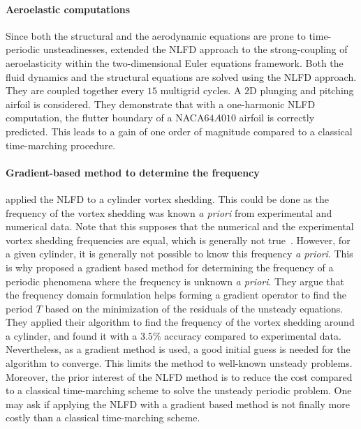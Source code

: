 \paragraph{Aeroelastic computations}
Since both the structural and the aerodynamic equations
are prone to time-periodic unsteadinesses,
\citet{Kachra2008} extended the NLFD approach to the strong-coupling of
aeroelasticity within the two-dimensional Euler equations framework.
Both the fluid dynamics and the structural equations
are solved using the NLFD approach. They are coupled together 
every $15$ multigrid cycles.
A $2$D plunging and pitching airfoil is considered.
They demonstrate that with a one-harmonic NLFD computation, the
flutter boundary of a NACA$64A010$ airfoil is correctly predicted.
This leads to a gain of one order of magnitude compared to a classical
time-marching procedure. 

\paragraph{Gradient-based method to determine the frequency}
\label{par:gradient_nlfd}
\citet{McMullen2001} applied the NLFD to a cylinder
vortex shedding. This could be done as the frequency of the
vortex shedding was known \emph{a priori} from experimental
and numerical data. Note that this supposes that the
numerical and the experimental vortex shedding frequencies
are equal, which is generally not true~\cite{Kato1991}.
However, for a given cylinder, it is generally not
possible to know this frequency \emph{a priori}. This is why
\citet{McMullen2002, McMullen2006a}
proposed a gradient based method for determining the frequency
of a periodic phenomena where the frequency is unknown
\emph{a priori}. They argue that the frequency domain formulation
helps forming a gradient operator to find the period $T$ based
on the minimization of the residuals of the unsteady equations.
They applied their algorithm to find the frequency of the vortex
shedding around a cylinder, and found it with a $3.5\%$ accuracy
compared to experimental data. Nevertheless, as a gradient method is 
used, a good initial guess is needed for the algorithm to
converge. This limits the method to well-known unsteady
problems. Moreover, the prior interest of the NLFD method is
to reduce the cost compared to a classical time-marching scheme
to solve the unsteady periodic problem. One may ask
if applying the NLFD with a gradient based method is not finally
more costly than a classical time-marching scheme.


